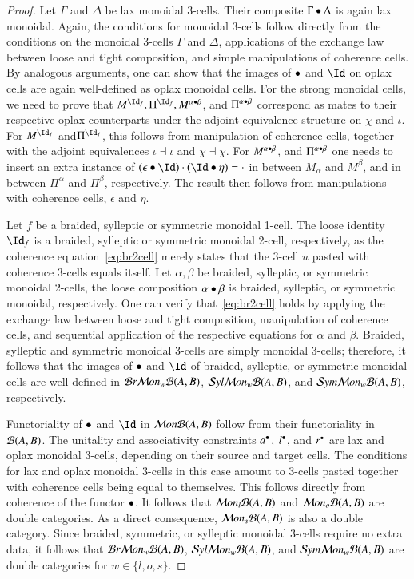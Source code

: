\begin{proof}
Let $\Gamma$ and $\Delta$ be lax monoidal 3-cells. Their composite $\Gamma \bullet \Delta$ is again lax monoidal. Again, the conditions for monoidal 3-cells follow directly from the conditions on the monoidal 3-cells $\Gamma$ and $\Delta$, applications of the exchange law between loose and tight composition, and simple manipulations of coherence cells.
By analogous arguments, one can show that the images of $\bullet$ and $\looseid$ on oplax cells are again well-defined as oplax monoidal cells. For  the strong monoidal cells, we need to prove that $M^{\looseid_f}, \Pi^{\looseid_f}, M^{\alpha \horc \beta}$, and $\Pi^{\alpha \bullet \beta}$ correspond as mates to their respective oplax counterparts under the adjoint equivalence structure on $\chi$ and $\iota$. For $M^{\looseid_f}$ and$ \Pi^{\looseid_f}$, this follows from manipulation of coherence cells, together with the adjoint equivalences $\iota \dashv \bar{\iota}$ and $\chi \dashv \bar{\chi}$. For $M^{\alpha \bullet \beta}$, and $\Pi^{\alpha \bullet \beta}$ one needs to insert an extra instance of $(\epsilon \horc \looseid) \verc (\looseid \horc \eta) = \verc$ in between $M_{\alpha}$ and $M^{\beta}$, and in between $\Pi^{\alpha}$ and $\Pi^{\beta}$, respectively. The result then follows from manipulations with coherence cells, $\epsilon$ and $\eta$.

Let $f$ be a braided, sylleptic or symmetric monoidal 1-cell. The loose identity $\looseid_f$ is a braided, sylleptic or symmetric monoidal 2-cell, respectively, as the coherence equation~\ref{eq:br2cell} merely states that the 3-cell $u$ pasted with coherence 3-cells equals itself. Let $\alpha, \beta$ be braided, sylleptic, or symmetric monoidal 2-cells, the loose composition $\alpha \bullet \beta$ is braided, sylleptic, or symmetric monoidal, respectively. One can verify that~\ref{eq:br2cell} holds by applying the exchange law between loose and tight composition, manipulation of coherence cells, and sequential application of the respective equations for $\alpha$ and $\beta$.  Braided, sylleptic and symmetric monoidal 3-cells are simply monoidal 3-cells; therefore, it follows that the images of $\bullet$ and $\looseid$ of braided, sylleptic, or symmetric monoidal cells are well-defined in $\mathcal{B} r \mathcal{M} on_w\mathcal{B}(A,B)$, $\mathcal{S} yl \mathcal{M} on_w\mathcal{B}(A,B)$, and $\mathcal{S} ym \mathcal{M} on_w\mathcal{B}(A,B)$, respectively.

Functoriality of $\bullet$ and $\looseid$ in $\mathcal{M} on \mathcal{B}(A,B)$ follow from their functoriality in $\mathcal{B}(A,B)$. 
The unitality and associativity constraints $a^{\bullet}$, $l^{\bullet}$, and $r^{\bullet}$ are lax and oplax monoidal 3-cells, depending on their source and target cells. The conditions for lax and oplax monoidal 3-cells in this case amount to 3-cells pasted together with coherence cells being equal to themselves. This follows directly from coherence of the functor $\bullet$. It follows that $\mathcal{M} on_l\mathcal{B}(A,B)$ and $\mathcal{M} on_o\mathcal{B}(A,B)$ are double categories. As a direct consequence, $\mathcal{M} on_s\mathcal{B}(A,B)$ is also a double category.
Since braided, symmetric, or sylleptic monoidal 3-cells require no extra data, it follows that $\mathcal{B} r \mathcal{M} on_w\mathcal{B}(A,B)$, $\mathcal{S} yl \mathcal{M} on_w\mathcal{B}(A,B)$, and $\mathcal{S} ym \mathcal{M} on_w\mathcal{B}(A,B)$ are double categories for $w \in \{l,o,s\}$.
\end{proof}



